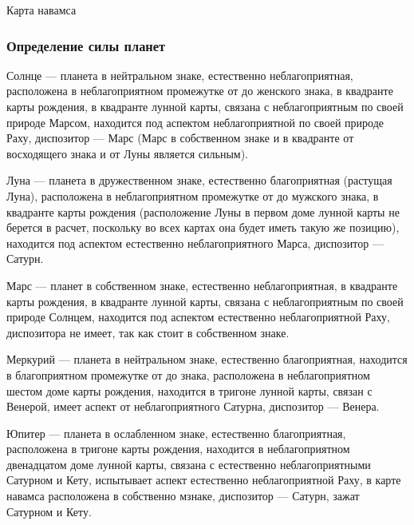 \begin{table}
	\caption{Карта навамса}
	\natal[asc=12,one=РАХУ\\ЮПИТЕР,four=ЛУНА,five=СОЛНЦЕ,seven=МАРС\\КЕТУ,ten=САТУРН,twelve=МЕРКУРИЙ\\ВЕНЕРА]{}
\end{table}

\subsubsection*{Определение силы планет}

Солнце --- планета в нейтральном знаке, естественно неблагоприятная, расположена в неблагоприятном промежутке от  до  женского знака, в квадранте карты рождения, в квадранте лунной карты, связана с неблагоприятным по своей природе Марсом, находится под аспектом неблагоприятной по своей природе Раху, диспозитор --- Марс (Марс в собственном знаке и в квадранте от восходящего знака и от Луны является сильным).

Луна --- планета в дружественном знаке, естественно благоприятная (растущая Луна), расположена в неблагоприятном промежутке от  до  мужского знака, в квадранте карты рождения (расположение Луны в первом доме лунной карты не берется в расчет, поскольку во всех картах она будет иметь такую же позицию), находится под аспектом естественно неблагоприятного Марса, диспозитор --- Сатурн.

Марс --- планет в собственном знаке, естественно неблагоприятная, в квадранте карты рождения, в квадранте лунной карты, связана с неблагоприятным по своей природе Солнцем, находится под аспектом естественно неблагоприятной Раху, диспозитора не имеет, так как стоит в собственном знаке.

Меркурий --- планета в нейтральном знаке, естественно благоприятная, находится в благоприятном промежутке от  до  знака, расположена в неблагоприятном шестом доме карты рождения, находится в тригоне лунной карты, связан с Венерой, имеет аспект от неблагоприятного Сатурна, диспозитор --- Венера.

Юпитер --- планета в ослабленном знаке, естественно благоприятная, расположена в тригоне карты рождения, находится в неблагоприятном двенадцатом доме лунной карты, связана с естественно неблагоприятными Сатурном и Кету, испытывает аспект естественно неблагоприятной Раху, в карте навамса расположена в собственно мзнаке, диспозитор --- Сатурн, зажат Сатурном и Кету.

